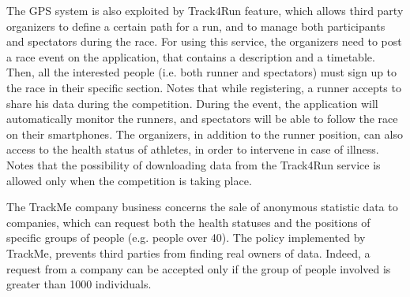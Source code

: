 The GPS system is also exploited by Track4Run feature, which allows third party organizers to define a certain path for a run, and to manage both participants and spectators during the race.
For using this service, the organizers need to post a race event on the application, that contains a description and a timetable. 
Then, all the interested people (i.e. both runner and spectators) must sign up to the race in their specific section. 
Notes that while registering, a runner accepts to share his data during the competition. 
During the event, the application will automatically monitor the runners, and spectators will be able to follow the race on their smartphones.
The organizers, in addition to the runner position, can also access to the health status of athletes, in order to intervene in case of illness. 
Notes that the possibility of downloading data from the Track4Run service is allowed only when the competition is taking place. \\
\par
The TrackMe company business concerns the sale of anonymous statistic data to companies, which can request both the health statuses and the positions of specific groups of people (e.g. people over 40). 
The policy implemented by TrackMe, prevents third parties from finding real owners of data. 
Indeed, a request from a company can be accepted only if the group of people involved is greater than 1000 individuals.